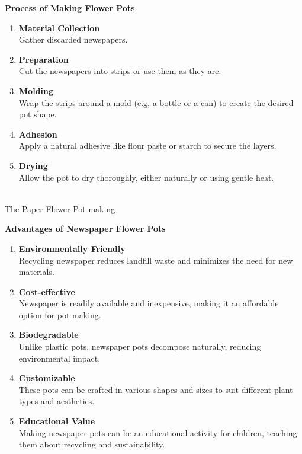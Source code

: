 \documentclass[12pt]{article}
\newcommand{\img}[2]{\scalebox{#1}{\texttt{[image: \#2]}}}
\begin{document}
	\noindent \textbf{Process of Making Flower Pots}
	\begin{enumerate}[label=\textbf{\arabic*.}]
		\item \textbf{Material Collection} \\
		Gather discarded newspapers.
		\item \textbf{Preparation} \\
		Cut the newspapers into strips or use them as they are.
		\item \textbf{Molding} \\
		Wrap the strips around a mold (e.g, a bottle or a can) to create the desired pot shape.
		\item \textbf{Adhesion} \\
		Apply a natural adhesive like flour paste or starch to secure the layers.
		 \newpage
		\item \textbf{Drying} \\
		Allow the pot to dry thoroughly, either naturally or using gentle heat.
	\end{enumerate}

	\begin{center}
		\img{.15}{Waste/Paper Craft-0} ~ \img{.15}{Waste/Paper Craft-1} ~ \img{.15}{Waste/Paper_Craft} \\ The Paper Flower Pot making
	\end{center}

	\noindent \textbf{Advantages of Newspaper Flower Pots}
	\begin{enumerate}[label=\textbf{\arabic*.}]
		\item \textbf{Environmentally Friendly} \\
		Recycling newspaper reduces landfill waste and minimizes the need for new materials.
		\item \textbf{Cost-effective} \\
		Newspaper is readily available and inexpensive, making it an affordable option for pot making.
		\item \textbf{Biodegradable} \\
		Unlike plastic pots, newspaper pots decompose naturally, reducing environmental impact.
		\item \textbf{Customizable} \\
		These pots can be crafted in various shapes and sizes to suit different plant types and aesthetics.
		\item \textbf{Educational Value} \\
		Making newspaper pots can be an educational activity for children, teaching them about recycling and sustainability.
	\end{enumerate}  \newpage
\end{document}
